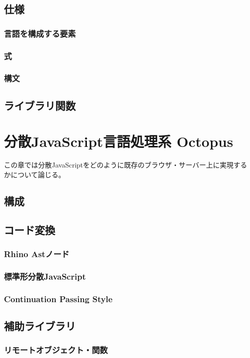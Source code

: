 \documentclass[a4j,12pt]{jreport}
\begin{document}
\section{仕様}
\subsection{言語を構成する要素}
\subsection{式}
\subsection{構文}
\section{ライブラリ関数}

\chapter{分散JavaScript言語処理系 Octopus}
この章では分散JavaScriptをどのように既存のブラウザ・サーバー上に実現するかについて論じる。
\section{構成}
\section{コード変換}
\subsection{Rhino Astノード}
\subsection{標準形分散JavaScript}
\subsection{Continuation Passing Style}
\section{補助ライブラリ}
\subsection{リモートオブジェクト・関数}
\end{document}
